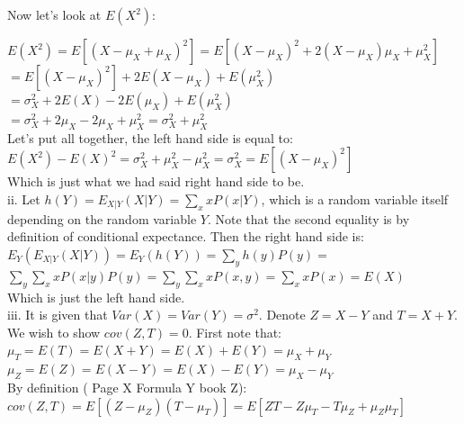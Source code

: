 \documentclass[12pt]{article}
\begin{document}
Now let's look at $E(X^2)$:

$E(X^2) = E[ (X-\mu_X+\mu_X)^2 ] =  E[  (X-\mu_X)^2 + 2(X-\mu_X)\mu_X + \mu_X^2  ]$ \\

$= E[(X-\mu_X)^2] + 2E(X-\mu_X) + E(\mu_X^2) $\\

$ = \sigma_X^2 + 2E(X) - 2E(\mu_X) + E(\mu_X^2) $ \\

$ = \sigma_X^2 +2\mu_X -2\mu_X + \mu_X^2 = \sigma_X^2 + \mu_X^2 $ \\

Let's put all together, the left hand side is equal to:\\

$E(X^2)-E(X)^2 = \sigma_X^2 + \mu_X^2 - \mu_X^2 = \sigma_X^2 = E[ (X-\mu_X)^2 ]  $ \\

Which is just what we had said right hand side to be. \\

ii. Let $h(Y) = E_{X|Y}(X|Y) = \sum_x xP(x|Y) $, which is a random variable itself depending on the random variable $Y$. Note that the second equality is by definition of conditional expectance. Then the right hand side is:\\

$E_Y( E_{X|Y}(X|Y)  )  = E_Y(h(Y)) = \sum_y h(y)P(y) =  $\\

$ \sum_y \sum_x xP(x|y)  P(y)    = \sum_y \sum_x xP(x,y)   =\sum_x xP(x) = E(X)  $ \\

Which is just the left hand side. \\

iii. It is given that $Var(X) = Var(Y) = \sigma^2 $. Denote $Z=X-Y$ and $T=X+Y$. We wish to show $cov(Z,T)=0$.  First note that: \\

$\mu_T = E(T) = E(X+Y) = E(X) + E(Y) = \mu_X + \mu_Y $ \\

$\mu_Z = E(Z) = E(X-Y) = E(X) - E(Y) = \mu_X - \mu_Y $ \\

By definition ( Page X Formula Y book Z): \\

$cov(Z,T) = E[ (Z-\mu_Z)(T-\mu_T)] = E[ ZT - Z\mu_T - T\mu_Z +\mu_Z\mu_T    ] $ \\
\end{document}
